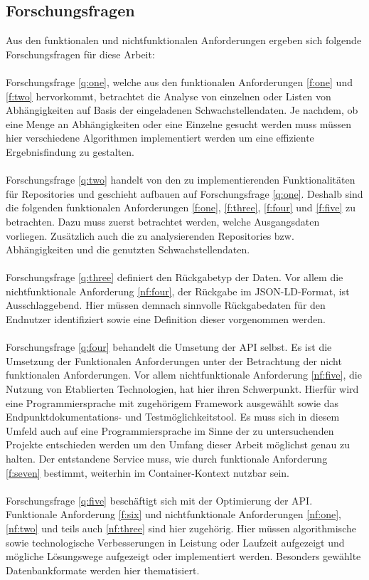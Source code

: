 \subsection{Forschungsfragen} \label{sec:Forschungsfragen}
    Aus den funktionalen und nichtfunktionalen Anforderungen ergeben sich folgende Forschungsfragen für diese Arbeit:
    \\ \\
    Forschungsfrage \ref{q:one}, welche aus den funktionalen Anforderungen \ref{f:one} und \ref{f:two} hervorkommt, betrachtet die Analyse von einzelnen oder Listen von Abhängigkeiten auf Basis der eingeladenen Schwachstellendaten.
    Je nachdem, ob eine Menge an Abhängigkeiten oder eine Einzelne gesucht werden muss müssen hier verschiedene Algorithmen implementiert werden um eine effiziente Ergebnisfindung zu gestalten.
    \\ \\
    Forschungsfrage \ref{q:two} handelt von den zu implementierenden Funktionalitäten für Repositories und geschieht aufbauen auf Forschungsfrage \ref{q:one}.
    Deshalb sind die folgenden funktionalen Anforderungen \ref{f:one}, \ref{f:three}, \ref{f:four} und \ref{f:five} zu betrachten.
    Dazu muss zuerst betrachtet werden, welche Ausgangsdaten vorliegen.
    Zusätzlich auch die zu analysierenden Repositories bzw. Abhängigkeiten und die genutzten Schwachstellendaten.
    \\ \\
    Forschungsfrage \ref{q:three} definiert den Rückgabetyp der Daten.
    Vor allem die nichtfunktionale Anforderung \ref{nf:four}, der Rückgabe im JSON-LD-Format, ist Ausschlaggebend.
    Hier müssen demnach sinnvolle Rückgabedaten für den Endnutzer identifiziert sowie eine Definition dieser vorgenommen werden.
    \\ \\
    Forschungsfrage \ref{q:four} behandelt die Umsetung der \ac{API} selbst.
    Es ist die Umsetzung der Funktionalen Anforderungen unter der Betrachtung der nicht funktionalen Anforderungen.
    Vor allem nichtfunktionale Anforderung \ref{nf:five}, die Nutzung von Etablierten Technologien, hat hier ihren Schwerpunkt.
    Hierfür wird eine Programmiersprache mit zugehörigem Framework ausgewählt sowie das End\-punkt\-doku\-mentations- und Test\-möglich\-keits\-tool.
    Es muss sich in diesem Umfeld auch auf eine Programmiersprache im Sinne der zu untersuchenden Projekte entschieden werden um den Umfang dieser Arbeit möglichst genau zu halten.
    Der entstandene Service muss, wie durch funktionale Anforderung \ref{f:seven} bestimmt, weiterhin im Container-Kontext nutzbar sein.
    \\ \\
    Forschungsfrage \ref{q:five} beschäftigt sich mit der Optimierung der \ac{API}.
    Funktionale Anforderung \ref{f:six} und nichtfunktionale Anforderungen \ref{nf:one}, \ref{nf:two} und teils auch \ref{nf:three} sind hier zugehörig.
    Hier müssen algorithmische sowie technologische Verbesserungen in Leistung oder Laufzeit aufgezeigt und mögliche Lösungswege aufgezeigt oder implementiert werden.
    Besonders gewählte Datenbankformate werden hier thematisiert.

    
    